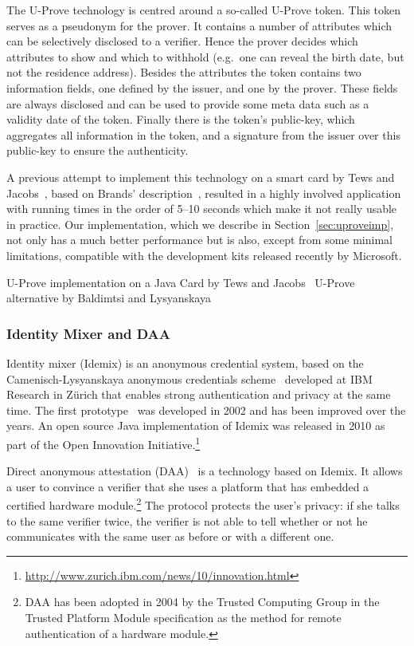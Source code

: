 The U-Prove technology is centred around a so-called U-Prove token. This
token serves as a pseudonym for the prover. It contains a number of
attributes which can be selectively disclosed to a verifier. Hence the
prover decides which attributes to show and which to withhold (e.g.\ one
can reveal the birth date, but not the residence address). Besides the
attributes the token contains two information fields, one defined by the
issuer, and one by the prover. These fields are always disclosed and can be
used to provide some meta data such as a validity date of the token.
Finally there is the token's public-key, which aggregates all information
in the token, and a signature from the issuer over this public-key to
ensure the authenticity.

A previous attempt to implement this technology on a smart card by Tews and
Jacobs~\cite{TewsJacobs09}, based on Brands' description~\cite{Brands2000},
resulted in a highly involved application with running times in the order
of 5--10 seconds which make it not really usable in practice. Our
implementation, which we describe in Section~\ref{sec:uproveimp}, not only
has a much better performance but is also, except from some minimal
limitations, compatible with the development kits released recently by
Microsoft.

U-Prove implementation on a Java Card by Tews and Jacobs~\cite{TewsJacobs09}
U-Prove alternative by Baldimtsi and Lysyanskaya~\cite{BaLy2012}

\subsubsection{Identity Mixer and DAA}\label{sec:idemix}

Identity mixer (Idemix) is an anonymous credential system, based on the
Camenisch-Lysyanskaya anonymous credentials
scheme~\cite{CamenischLysyanskaya2001, CamenischLysyanskaya2002,
Lysyanskaya2002} developed at IBM Research in Z\"urich that enables strong
authentication and privacy at the same time. The first
prototype~\cite{CamenischH02} was developed in 2002 and has been improved
over the years. An open source Java implementation of Idemix was released
in 2010 as part of the Open Innovation
Initiative.\footnote{\url{http://www.zurich.ibm.com/news/10/innovation.html}}

Direct anonymous attestation (DAA)~\cite{BrickellCC04} is a technology based
on Idemix. It allows a user to convince a verifier that she uses a platform
that has embedded a certified hardware module.\footnote{DAA has
been adopted in 2004 by the Trusted Computing Group in the Trusted Platform Module
specification as the method for remote authentication of a hardware
module.} The protocol protects the user's privacy: if she talks to the same
verifier twice, the verifier is not able to tell whether or not he
communicates with the same user as before or with a different one.

